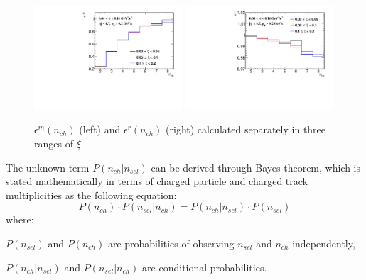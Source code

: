 \begin{figure}[h!]
	\centering
	\includegraphics[width=0.49\textwidth,page=1]{chapters/chrgSTAR/img/unfolding/correction_0.pdf}
	\includegraphics[width=0.49\textwidth,page=1]{chapters/chrgSTAR/img/unfolding/correction_1.pdf}
	\caption[$\epsilon^{m}(n_{ch})$ and $\epsilon^{r}(n_{ch})$ in three ranges of $\xi$]{$\epsilon^{m}(n_{ch})$ (left)  and $\epsilon^{r}(n_{ch})$ (right) calculated separately in three ranges of $\xi$.}
	\label{fig:correctionSTAR}
\end{figure}

The unknown term $P(n_{ch}|n_{sel})$ can be derived through Bayes theorem, which is stated mathematically in terms of charged particle and charged track multiplicities as the following equation:
\begin{equation}
P\left(n_{ch}\right)\cdot P\left(n_{sel}|n_{ch}\right) = P\left(n_{ch}|n_{sel}\right)\cdot P\left(n_{sel}\right)
\end{equation}
where:
\begin{description}
	\item $P(n_{sel})$ and $P(n_{ch})$ are probabilities of observing $n_{sel}$ and $n_{ch}$ independently,
	\item $P(n_{ch}|n_{sel})$ and $P(n_{sel}|n_{ch})$ are conditional probabilities.
\end{description}
 
